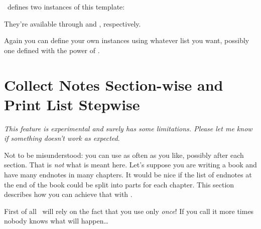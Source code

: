 \documentclass[load-preamble+]{cnltx-doc}
\begin{document}
\enotez\ defines two instances of this template:
\begin{sourcecode}
\end{sourcecode}
They're available through  and
, respectively.

Again you can define your own instances using whatever list you want, possibly
one defined with the power of .

\section{Collect Notes Section-wise and Print List Stepwise}\label{sec:split}
\emph{This feature is experimental and surely has some limitations.  Please
  let me know if something doesn't work as expected}.

Not to be misunderstood: you can use  as often as you like,
possibly after each section.  That is \emph{not} what is meant here.  Let's
suppose you are writing a book and have many endnotes in many chapters.  It
would be nice if the list of endnotes at the end of the book could be split
into parts for each chapter.  This section describes how you can achieve that
with \enotez.

First of all \enotez\ will rely on the fact that you use 
only \emph{once}!  If you call it more times nobody knows what will
happen\ldots
\end{document}
